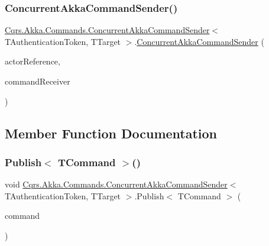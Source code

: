 \subsubsection{\texorpdfstring{Concurrent\+Akka\+Command\+Sender()}{ConcurrentAkkaCommandSender()}}
{\footnotesize\ttfamily \hyperlink{classCqrs_1_1Akka_1_1Commands_1_1ConcurrentAkkaCommandSender}{Cqrs.\+Akka.\+Commands.\+Concurrent\+Akka\+Command\+Sender}$<$ T\+Authentication\+Token, T\+Target $>$.\hyperlink{classCqrs_1_1Akka_1_1Commands_1_1ConcurrentAkkaCommandSender}{Concurrent\+Akka\+Command\+Sender} (\begin{DoxyParamCaption}\item[{I\+Actor\+Ref}]{actor\+Reference,  }\item[{\hyperlink{interfaceCqrs_1_1Commands_1_1ICommandReceiver}{I\+Command\+Receiver}$<$ T\+Authentication\+Token $>$}]{command\+Receiver }\end{DoxyParamCaption})}



\subsection{Member Function Documentation}
\mbox{\label{classCqrs_1_1Akka_1_1Commands_1_1ConcurrentAkkaCommandSender_a5f65348c92377342ad8400eb6b40a2ac_a5f65348c92377342ad8400eb6b40a2ac}} 
\subsubsection{\texorpdfstring{Publish$<$ T\+Command $>$()}{Publish< TCommand >()}\hspace{0.1cm}{\footnotesize\ttfamily [1/2]}}
{\footnotesize\ttfamily void \hyperlink{classCqrs_1_1Akka_1_1Commands_1_1ConcurrentAkkaCommandSender}{Cqrs.\+Akka.\+Commands.\+Concurrent\+Akka\+Command\+Sender}$<$ T\+Authentication\+Token, T\+Target $>$.Publish$<$ T\+Command $>$ (\begin{DoxyParamCaption}\item[{T\+Command}]{command }\end{DoxyParamCaption})}

